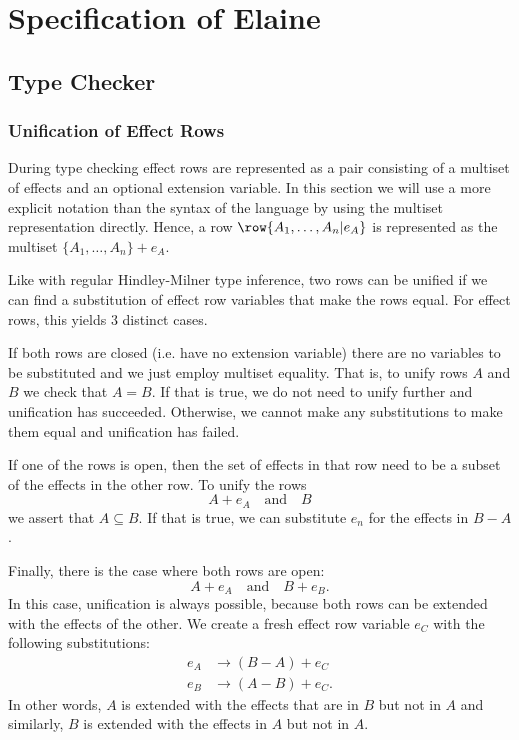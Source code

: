 \section{Specification of Elaine}
\subsection{Type Checker}\label{sec:typechecker}
\subsubsection{Unification of Effect Rows}


During type checking effect rows are represented as a pair consisting of a multiset of effects and an optional extension variable. In this section we will use a more explicit notation than the syntax of the language by using the multiset representation directly. Hence, a row $\row{A_1,\dots,A_n|e_A}$ is represented as the multiset $\{A_1,\dots,A_n\} + e_A$.

Like with regular Hindley-Milner type inference, two rows can be unified if we can find a substitution of effect row variables that make the rows equal. For effect rows, this yields 3 distinct cases.

If both rows are closed (i.e. have no extension variable) there are no variables to be substituted and we just employ multiset equality. That is, to unify rows $A$ and $B$ we check that $A = B$. If that is true, we do not need to unify further and unification has succeeded. Otherwise, we cannot make any substitutions to make them equal and unification has failed.

If one of the rows is open, then the set of effects in that row need to be a subset of the effects in the other row. To unify the rows
\[ A + e_A \quad\text{and}\quad B \]
we assert that $A \subseteq B$. If that is true, we can substitute $e_n$ for the effects in $B - A$.

Finally, there is the case where both rows are open:
\[ A + e_A \quad\text{and}\quad B + e_B. \]
In this case, unification is always possible, because both rows can be extended with the effects of the other. We create a fresh effect row variable $e_C$ with the following substitutions:
\begin{align*}
    e_A &\to (B - A) + e_C \\
    e_B &\to (A - B) + e_C.
\end{align*}
In other words, $A$ is extended with the effects that are in $B$ but not in $A$ and similarly, $B$ is extended with the effects in $A$ but not in $A$.
